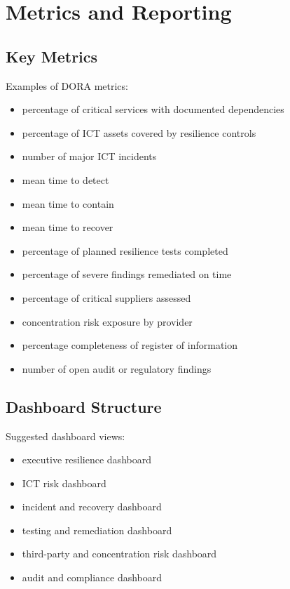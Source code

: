 \documentclass[
  letterpaper,
  DIV=11,
  numbers=noendperiod]{scrartcl}
\providecommand{\tightlist}{%
  \setlength{\itemsep}{0pt}\setlength{\parskip}{0pt}}
\begin{document}
\section{Metrics and Reporting}\label{metrics-and-reporting}

\subsection{Key Metrics}\label{key-metrics}

Examples of DORA metrics:

\begin{itemize}
\tightlist
\item
  percentage of critical services with documented dependencies
\item
  percentage of ICT assets covered by resilience controls
\item
  number of major ICT incidents
\item
  mean time to detect
\item
  mean time to contain
\item
  mean time to recover
\item
  percentage of planned resilience tests completed
\item
  percentage of severe findings remediated on time
\item
  percentage of critical suppliers assessed
\item
  concentration risk exposure by provider
\item
  percentage completeness of register of information
\item
  number of open audit or regulatory findings
\end{itemize}

\subsection{Dashboard Structure}\label{dashboard-structure}

Suggested dashboard views:

\begin{itemize}
\tightlist
\item
  executive resilience dashboard
\item
  ICT risk dashboard
\item
  incident and recovery dashboard
\item
  testing and remediation dashboard
\item
  third-party and concentration risk dashboard
\item
  audit and compliance dashboard
\end{itemize}
\end{document}
